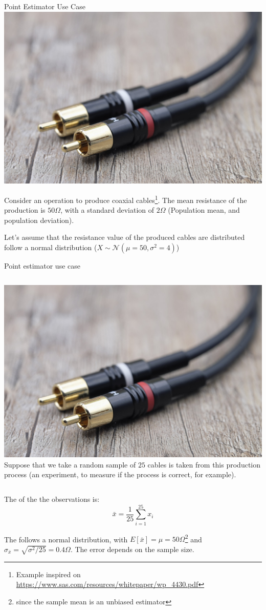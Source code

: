 \begin{frame}{Point Estimator Use Case}
  \includegraphics[width=.4\textwidth]{../img/pixabay_cable}
  \bigskip

  Consider an operation to produce coaxial cables\footnote{Example inspired on \url{https://www.sas.com/resources/whitepaper/wp_4430.pdf}}. The mean resistance of the production is $50\Omega$, with a standard deviation of $2\Omega$ (Population mean, and population deviation).\bigskip

  Let's assume that the resistance value of the produced cables are distributed follow a normal distribution ($X\sim\mathcal{N}\left(\mu=50,\sigma^2=4\right)$)
\end{frame}

\begin{frame}{Point estimator use case}
  \begin{columns}
    \includegraphics[width=1\textwidth]{../img/pixabay_cable}
    Suppose that we take a random sample of $25$ cables is taken from
    this production process (an experiment, to measure if the process
    is correct, for example).
  \end{columns}
  \bigskip
The  of the the observations is:
\begin{equation*}
\bar{x} = \frac{1}{25}\sum\limits_{i=1}^{25}{x_i}
\end{equation*}

The  follows a normal distribution, with $E[\bar{x}] = \mu = 50\Omega$\footnote{since the sample mean is an unbiased estimator} and $\sigma_{\bar{x}} = \sqrt{\sigma^2/25} = 0.4\Omega$. The error depends on the sample size.
\end{frame}


